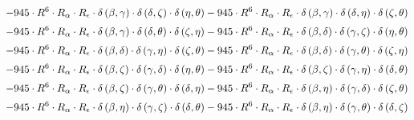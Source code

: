 \begin{subequations}
\begin{gather}
 \\[0.2em] \notag 		 - 945 \cdot R^{6} \cdot R_{\alpha{}} \cdot R_{\epsilon{}} \cdot \delta{}\left(\beta{}, \gamma{}\right) \cdot \delta{}\left(\delta{}, \zeta{}\right) \cdot \delta{}\left(\eta{}, \theta{}\right)- 945 \cdot R^{6} \cdot R_{\alpha{}} \cdot R_{\epsilon{}} \cdot \delta{}\left(\beta{}, \gamma{}\right) \cdot \delta{}\left(\delta{}, \eta{}\right) \cdot \delta{}\left(\zeta{}, \theta{}\right) 
 \\[0.2em] \notag 		 - 945 \cdot R^{6} \cdot R_{\alpha{}} \cdot R_{\epsilon{}} \cdot \delta{}\left(\beta{}, \gamma{}\right) \cdot \delta{}\left(\delta{}, \theta{}\right) \cdot \delta{}\left(\zeta{}, \eta{}\right)- 945 \cdot R^{6} \cdot R_{\alpha{}} \cdot R_{\epsilon{}} \cdot \delta{}\left(\beta{}, \delta{}\right) \cdot \delta{}\left(\gamma{}, \zeta{}\right) \cdot \delta{}\left(\eta{}, \theta{}\right) 
 \\[0.2em] \notag 		 - 945 \cdot R^{6} \cdot R_{\alpha{}} \cdot R_{\epsilon{}} \cdot \delta{}\left(\beta{}, \delta{}\right) \cdot \delta{}\left(\gamma{}, \eta{}\right) \cdot \delta{}\left(\zeta{}, \theta{}\right)- 945 \cdot R^{6} \cdot R_{\alpha{}} \cdot R_{\epsilon{}} \cdot \delta{}\left(\beta{}, \delta{}\right) \cdot \delta{}\left(\gamma{}, \theta{}\right) \cdot \delta{}\left(\zeta{}, \eta{}\right) 
 \\[0.2em] \notag 		 - 945 \cdot R^{6} \cdot R_{\alpha{}} \cdot R_{\epsilon{}} \cdot \delta{}\left(\beta{}, \zeta{}\right) \cdot \delta{}\left(\gamma{}, \delta{}\right) \cdot \delta{}\left(\eta{}, \theta{}\right)- 945 \cdot R^{6} \cdot R_{\alpha{}} \cdot R_{\epsilon{}} \cdot \delta{}\left(\beta{}, \zeta{}\right) \cdot \delta{}\left(\gamma{}, \eta{}\right) \cdot \delta{}\left(\delta{}, \theta{}\right) 
 \\[0.2em] \notag 		 - 945 \cdot R^{6} \cdot R_{\alpha{}} \cdot R_{\epsilon{}} \cdot \delta{}\left(\beta{}, \zeta{}\right) \cdot \delta{}\left(\gamma{}, \theta{}\right) \cdot \delta{}\left(\delta{}, \eta{}\right)- 945 \cdot R^{6} \cdot R_{\alpha{}} \cdot R_{\epsilon{}} \cdot \delta{}\left(\beta{}, \eta{}\right) \cdot \delta{}\left(\gamma{}, \delta{}\right) \cdot \delta{}\left(\zeta{}, \theta{}\right) 
 \\[0.2em] \notag 		 - 945 \cdot R^{6} \cdot R_{\alpha{}} \cdot R_{\epsilon{}} \cdot \delta{}\left(\beta{}, \eta{}\right) \cdot \delta{}\left(\gamma{}, \zeta{}\right) \cdot \delta{}\left(\delta{}, \theta{}\right)- 945 \cdot R^{6} \cdot R_{\alpha{}} \cdot R_{\epsilon{}} \cdot \delta{}\left(\beta{}, \eta{}\right) \cdot \delta{}\left(\gamma{}, \theta{}\right) \cdot \delta{}\left(\delta{}, \zeta{}\right) 

\end{gather}
\end{subequations}
